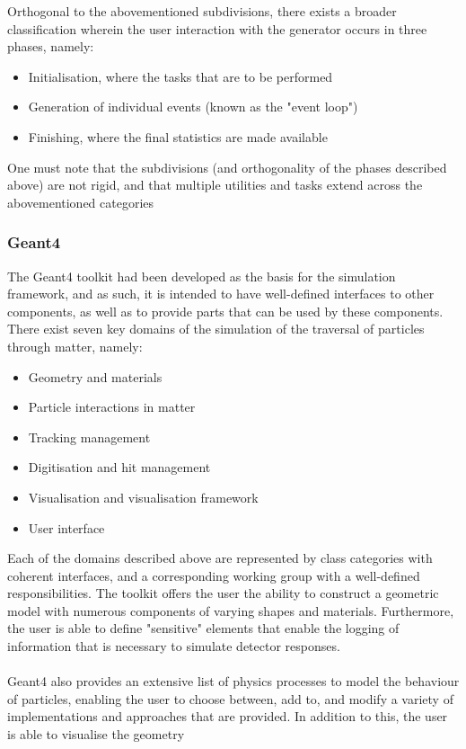 Orthogonal to the abovementioned subdivisions, there exists a broader classification wherein the user interaction with the generator occurs in three phases, namely:
\begin{itemize}
    \item Initialisation, where the tasks that are to be performed
    \item Generation of individual events (known as the "event loop")
    \item Finishing, where the final statistics are made available
\end{itemize}
One must note that the subdivisions (and orthogonality of the phases described above) are not rigid, and that multiple utilities and tasks extend across the abovementioned categories
\subsubsection{Geant4}\label{Geant4}
The Geant4 toolkit had been developed as the basis for the simulation framework, and as such, it is intended to have well-defined interfaces to other components, as well as to provide parts that can be used by these components. 
There exist seven key domains of the simulation of the traversal of particles through matter, namely:
\begin{itemize}
    \item Geometry and materials
    \item Particle interactions in matter
    \item Tracking management
    \item Digitisation and hit management
    \item Visualisation and visualisation framework
    \item User interface
\end{itemize}
Each of the domains described above are represented by class categories with coherent interfaces, and a corresponding working group with a well-defined responsibilities. The toolkit offers the user the ability to construct a geometric model 
with numerous components of varying shapes and materials. Furthermore, the user is able to define "sensitive" elements that enable the logging of information that is necessary to simulate detector responses.\\
\\
Geant4 also provides an extensive list of physics processes to model the behaviour of particles, enabling the user to choose between, add to, and modify a variety of implementations and approaches that are provided. In addition to this, the user is able to visualise the geometry
